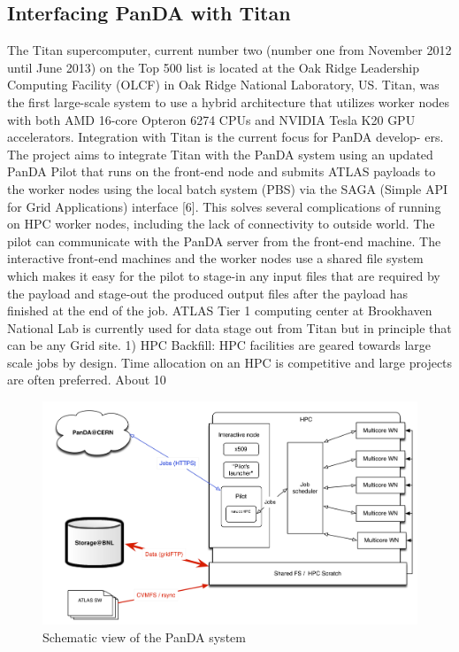 \documentclass[10pt, conference, compsocconf]{IEEEtran}
\begin{document}
\subsection{Interfacing PanDA with Titan}
The Titan supercomputer, current number two (number one from November 2012 until June 2013) on the Top 500 list is located at the Oak Ridge Leadership Computing  Facility (OLCF) in Oak Ridge National Laboratory, US. Titan, was the first large-scale system to use  a hybrid architecture that utilizes worker nodes with both AMD 16-core Opteron 6274 CPUs and NVIDIA Tesla K20 GPU accelerators.
Integration with Titan is the current focus for PanDA develop- ers. The project aims to integrate Titan with the PanDA system using an updated PanDA Pilot that runs on the front-end node and submits ATLAS payloads to the worker nodes using the local batch system (PBS) via the SAGA (Simple API for Grid Applications) interface [6]. This solves several complications of  running on HPC worker nodes,  including the lack of connectivity to outside world. The pilot can communicate with the PanDA server from the front-end machine. The interactive front-end  machines and the worker nodes  use  a shared  file system  which makes  it  easy  for the pilot to stage-in  any input files that are required by the payload and stage-out the produced output files after the payload has finished at the end of the job. ATLAS Tier 1 computing  center at Brookhaven National Lab is currently  used for data stage out from Titan but in principle  that can be any Grid site.
1) HPC Backfill: HPC facilities are geared towards  large scale jobs by design. Time allocation on an HPC is competitive and large projects are often preferred. About 10%
\begin{figure}
\begin{center}
\includegraphics[width=\columnwidth]{figures/PandaInterfaceWithHPC.png}
\caption{Schematic view of the PanDA system\label{fig:architecture}}
\end{center}
\end{figure}
\end{document}
